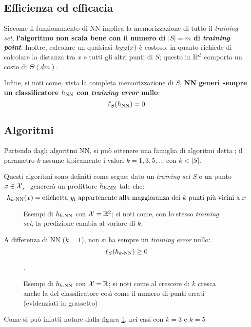 \subsection{Efficienza ed efficacia}

Siccome il funzionamento di NN implica la memorizzazione di tutto il 
\textit{training set}, \textbf{l'algoritmo non scala bene con il numero di
$|S| = m$ di \textit{training point}}. Inoltre, calcolare un qualsiasi
$h_{\text{NN}}(x)$ è costoso, in quanto richiede di calcolare la distanza tra $x$ e
tutti gli altri punti di $S$; questo in $\mathbb{R}^d$ comporta un costo di 
$\Theta (dm)$.

Infine, si noti come, vista la completa memorizzazione di $S$, \textbf{NN generi 
sempre un classificatore $h_{\text{NN}}$ con \textit{training error} nullo}:
$$ \ell_S(h_{\text{NN}})=0 $$

\subsection{Algoritmi \texorpdfstring{\kNN}{k-NN}}
Partendo dagli algoritmi NN, si può ottenere una famiglia di algoritmi detta
\kNN; il parametro $k$ assume tipicamente i valori $k=1,3,5,\dots$ con $k<|S|$.

Questi algoritmi sono definiti come segue: dato un \textit{training set} $S$ e un
punto $x \in \mathcal{X}$, \kNN \ genererà un predittore $h_{k\text{-NN}}$ tale che:
$$h_{k\text{-NN}}(x) = \text{etichetta $y_t$ appartenente alla maggioranza dei $k$ punti
più vicini a $x$} $$

\begin{figure}[h]
    \centering
    
    \caption{Esempi di $h_{k\text{-NN}}$ con $\mathcal{X}=\mathbb{R}^2$; si noti come, con lo stesso \textit{training set}, 
    la predizione cambia al variare di $k$. \label{fig:knn}}
\end{figure}
\vspace{1em}

A differenza di NN ($k=1$), non si ha sempre un \textit{training error} nullo:
$$ \ell_S(h_{k\text{-NN}})\geq0 $$

\begin{figure}[h]
    \centering
    
    \caption{Esempi di $h_{k\text{-NN}}$ con $\mathcal{X} = \mathbb{R}$; si noti come al crescere di $k$
     cresca anche la  del classificatore\label{fig:knn_line}
     così come il numero di punti errati (evidenziati in grassetto)}.
\end{figure}
\vspace{1em}

Come si può infatti notare dalla figura \ref{fig:knn}, nei casi con $k=3$ e $k=5$






